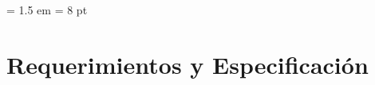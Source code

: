 \documentclass[a4paper, 10pt,titlepage]{article}
\author{Echevarría - Giusto - Farjat - Freijo }
\begin{document}
\parindent = 1.5 em 
\parskip = 8 pt %

\newcommand{\todo}{{\large\textbf{TODO: }}}
\newcommand{\paso}{\textsc{Paso }}
\newcommand{\func}[1]{\verb"#1"}
% 
%  



\tableofcontents


\section{Requerimientos y Especificación}



\newpage
\listoffigures
\end{document}
